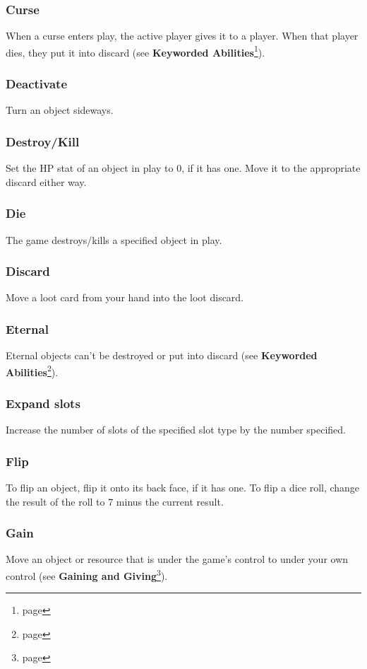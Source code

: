 \documentclass[10pt, a4paper, twoside]{article} %
\begin{document}
    \subsubsection*{Curse}
    When a curse enters play, the active player gives it to a player. When that player dies, they put it into discard (see \textbf{Keyworded Abilities}\footnote{page \pageref{keyworded}}).
    \subsubsection*{Deactivate}
    Turn an object sideways.
    \subsubsection*{Destroy/Kill}
    Set the HP stat of an object in play to 0, if it has one. Move it to the appropriate discard either way.
    \subsubsection*{Die}
    The game destroys/kills a specified object in play.
    \subsubsection*{Discard}
    Move a loot card from your hand into the loot discard.
    \subsubsection*{Eternal}
    Eternal objects can’t be destroyed or put into discard (see \textbf{Keyworded Abilities}\footnote{page \pageref{keyworded}}).
    \subsubsection*{Expand slots}
    Increase the number of slots of the specified slot type by the number specified.
    \subsubsection*{Flip}
    To flip an object, flip it onto its back face, if it has one. To flip a dice roll, change the result of the roll to 7 minus the current result.
    \subsubsection*{Gain}
    Move an object or resource that is under the game’s control to under your own control (see \textbf{Gaining and Giving}\footnote{page \pageref{gaining}}).
\end{document}
